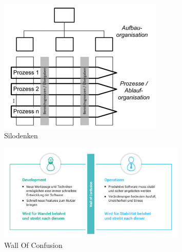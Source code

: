 \begin{figure}[h]
\centering
\includegraphics[width=0.7\textwidth]{Graphics/silodenken}
\caption{Silodenken \cite{halstenberg:2020}}
\end{figure}

\begin{figure}[h]
\centering
\includegraphics[width=0.8\textwidth]{Graphics/wall_of_confusion}
\caption{Wall Of Confusion \cite{novatec:2021}}
\end{figure}
